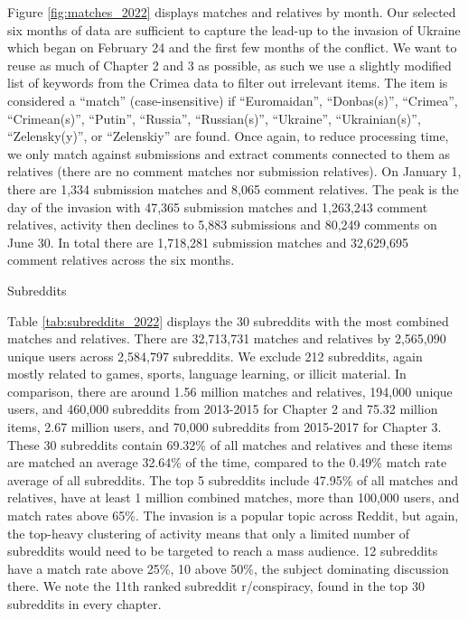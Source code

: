 \documentclass[doublespacing]{utdthesis}
\begin{document}
Figure \ref{fig:matches_2022} displays matches and relatives by month.
Our selected six months of data are sufficient to capture the lead-up to the invasion of Ukraine which began on February 24 and the first few months of the conflict.
We want to reuse as much of Chapter 2 and 3 as possible, as such we use a slightly modified list of keywords from the Crimea data to filter out irrelevant items.
The item is considered a ``match'' (case-insensitive) if ``Euromaidan'', ``Donbas(s)'', ``Crimea'', ``Crimean(s)'', ``Putin'', ``Russia'', ``Russian(s)'', ``Ukraine'', ``Ukrainian(s)'', ``Zelensky(y)'', or ``Zelenskiy'' are found.
Once again, to reduce processing time, we only match against submissions and extract comments connected to them as relatives (there are no comment matches nor submission relatives).
On January 1, there are 1,334 submission matches and 8,065 comment relatives.
The peak is the day of the invasion with 47,365 submission matches and 1,263,243 comment relatives, activity then declines to 5,883 submissions and 80,249 comments on June 30.
In total there are 1,718,281 submission matches and 32,629,695 comment relatives across the six months.

\begin{table}[!ht]
\centering
\caption{Subreddits}

\label{tab:subreddits_2022}
\end{table}

Table \ref{tab:subreddits_2022} displays the 30 subreddits with the most combined matches and relatives.
There are 32,713,731 matches and relatives by 2,565,090 unique users across 2,584,797 subreddits.
We exclude 212 subreddits, again mostly related to games, sports, language learning, or illicit material.
In comparison, there are around 1.56 million matches and relatives, 194,000 unique users, and 460,000 subreddits from 2013-2015 for Chapter 2 and 75.32 million items, 2.67 million users, and 70,000 subreddits from 2015-2017 for Chapter 3.
These 30 subreddits contain 69.32\% of all matches and relatives and these items are matched an average 32.64\% of the time, compared to the 0.49\% match rate average of all subreddits.
The top 5 subreddits include 47.95\% of all matches and relatives, have at least 1 million combined matches, more than 100,000 users, and match rates above 65\%.
The invasion is a popular topic across Reddit, but again, the top-heavy clustering of activity means that only  a limited number of subreddits would need to be targeted to reach a mass audience.
12 subreddits have a match rate above 25\%, 10 above 50\%, the subject dominating discussion there.
We note the 11th ranked subreddit r/conspiracy, found in the top 30 subreddits in every chapter.
\end{document}
